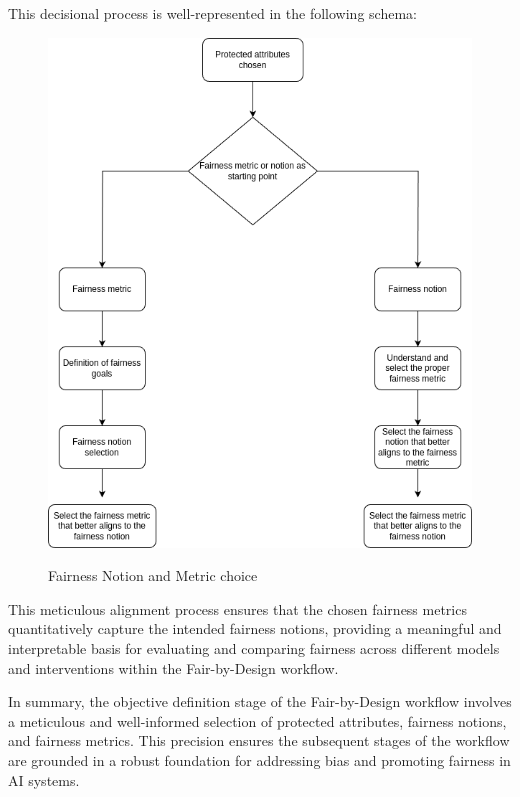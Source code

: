 This decisional process is well-represented in the following schema:
\newpage
\begin{figure}[H]
    \centering
    \includegraphics[width=.9\textwidth, height=1.3\textwidth]{notion-metric.png}
    \label{fig:choice}
    \caption{Fairness Notion and Metric choice}
\end{figure}

This meticulous alignment process ensures that the chosen fairness metrics quantitatively capture the intended fairness notions, providing a meaningful and interpretable basis for evaluating and comparing fairness across different models and interventions within the Fair-by-Design workflow.

In summary, the objective definition stage of the Fair-by-Design workflow involves a meticulous and well-informed selection of protected attributes, fairness notions, and fairness metrics. This precision ensures the subsequent stages of the workflow are grounded in a robust foundation for addressing bias and promoting fairness in AI systems.

